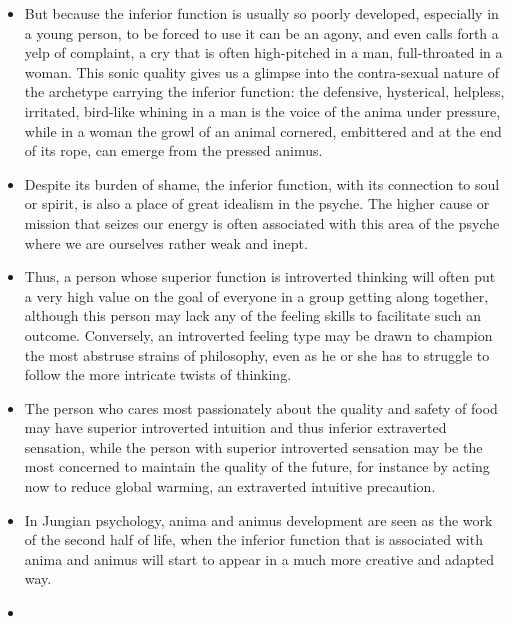 \begin{itemize}
\item

But because the inferior function is usually so poorly developed, especially in
a young person, to be forced to use it can be an agony, and even calls forth a
yelp of complaint, a cry that is often high-pitched in a man, full-throated in
a woman. This sonic quality gives us a glimpse into the contra-sexual nature of
the archetype carrying the inferior function: the defensive, hysterical,
helpless, irritated, bird-like whining in a man is the voice of the anima under
pressure, while in a woman the growl of an animal cornered, embittered and at
the end of its rope, can emerge from the pressed animus.

\item

Despite its burden of shame, the inferior function, with its connection to soul
or spirit, is also a place of great idealism in the psyche. The higher cause or
mission that seizes our energy is often associated with this area of the psyche
where we are ourselves rather weak and inept.

\item

Thus, a person whose superior function is introverted thinking will often put a
very high value on the goal of everyone in a group getting along together,
although this person may lack any of the feeling skills to facilitate such an
outcome. Conversely, an introverted feeling type may be drawn to champion the
most abstruse strains of philosophy, even as he or she has to struggle to
follow the more intricate twists of thinking.

\item

The person who cares most passionately about the quality and safety of food may
have superior introverted intuition and thus inferior extraverted sensation,
while the person with superior introverted sensation may be the most concerned
to maintain the quality of the future, for instance by acting now to reduce
global warming, an extraverted intuitive precaution.

\item

In Jungian psychology, anima and animus development are seen as the work of the
second half of life, when the inferior function that is associated with anima
and animus will start to appear in a much more creative and adapted way.

\item


\end{itemize}
